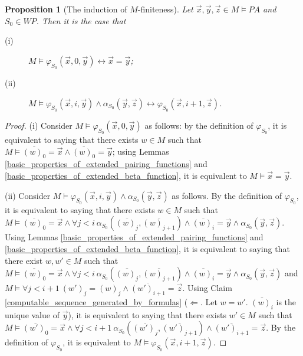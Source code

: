 \documentclass[a4paper,11pt]{article}
\begin{document}
\newtheorem{induction_of_m_finiteness}[X_semantics_of_while_programs]{Proposition}
\begin{induction_of_m_finiteness}[The induction of $M$-finiteness]\label{induction_of_m_finiteness}
Let $\vec{x},\vec{y},\vec{z}\in M \models PA$ and $S_0\in WP$. Then it is the case that
\begin{description}
  \item[(i)] $M \models \varphi_{S_0}(\vec{x},0,\vec{y}) \leftrightarrow \vec{x} = \vec{y}$;
  \item[(ii)] $M \models \varphi_{S_0}(\vec{x},i,\vec{y}) \wedge \alpha_{S_0}(\vec{y},\vec{z}) \leftrightarrow \varphi_{S_0}(\vec{x},i+1,\vec{z})$.
\end{description}
\end{induction_of_m_finiteness}
\begin{proof}
  (i) Consider $M \models \varphi_{S_0}(\vec{x},0,\vec{y})$ as follows: by the definition of $\varphi_{S_0}$, it is equivalent to saying that there exists $w\in M$ such that $M \models \overline{(w)_0} = \vec{x} \wedge \overline{(w)_0} = \vec{y}$; using Lemmas \ref{basic_properties_of_extended_pairing_functions} and \ref{basic_properties_of_extended_beta_function}, it is equivalent to $M\models \vec{x}=\vec{y}$.

  (ii) Consider $M \models \varphi_{S_0}(\vec{x},i,\vec{y}) \wedge \alpha_{S_0}(\vec{y},\vec{z})$ as follows. By the definition of $\varphi_{S_0}$, it is equivalent to saying that there exists $w\in M$ such that $M \models \overline{(w)_0} = \vec{x} \wedge \forall j<i\ \alpha_{S_0}(\overline{(w)_j},\overline{(w)_{j+1}}) \wedge \overline{(w)_i} = \vec{y} \wedge \alpha_{S_0}(\vec{y},\vec{z})$. Using Lemmas \ref{basic_properties_of_extended_pairing_functions} and \ref{basic_properties_of_extended_beta_function}, it is equivalent to saying that there exist $w, w'\in M$ such that $M \models \overline{(w)_0} = \vec{x} \wedge \forall j<i\ \alpha_{S_0}(\overline{(w)_j},\overline{(w)_{j+1}}) \wedge \overline{(w)_i} = \vec{y} \wedge \alpha_{S_0}(\vec{y},\vec{z})$ and $M \models \forall j<i+1\ (w')_j=(w)_j \wedge \overline{(w')_{i+1}} = \vec{z}$. Using Claim \ref{computable_sequence_generated_by_formulas} ($\Leftarrow$. Let $w=w'$. $\overline{(w)_i}$ is the unique value of $\vec{y}$), it is equivalent to saying that there exists $w'\in M$ such that $M \models \overline{(w')_0} = \vec{x} \wedge \forall j<i+1\ \alpha_{S_0}(\overline{(w')_j},\overline{(w')_{j+1}}) \wedge \overline{(w')_{i+1}} = \vec{z}$. By the definition of $\varphi_{S_0}$, it is equivalent to $M \models \varphi_{S_0}(\vec{x},i+1,\vec{z})$.
\end{proof}
\end{document}
